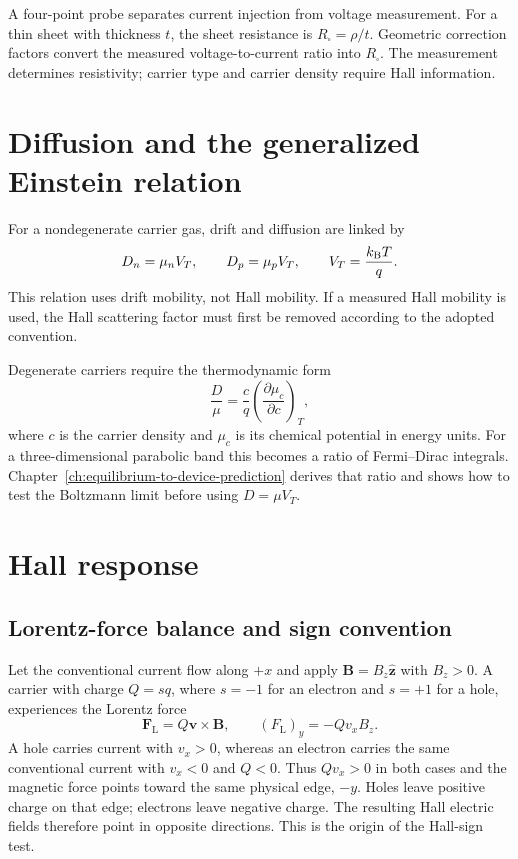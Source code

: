 A four-point probe separates current injection from voltage measurement.  For
a thin sheet with thickness $t$, the sheet resistance is $R_{\square}=\rho/t$.
Geometric correction factors convert the measured voltage-to-current ratio
into $R_{\square}$.  The measurement determines resistivity; carrier type and
carrier density require Hall information.

\section{Diffusion and the generalized Einstein relation}

For a nondegenerate carrier gas, drift and diffusion are linked by
\begin{equation}
 D_n=\mu_nV_T,
 \qquad
 D_p=\mu_pV_T,
 \qquad
 V_T=\frac{k_{\mathrm B} T}{q}.
 \label{eq:transport-classical-einstein}
\end{equation}
This relation uses drift mobility, not Hall mobility.  If a measured Hall
mobility is used, the Hall scattering factor must first be removed according to
the adopted convention.

Degenerate carriers require the thermodynamic form
\begin{equation}
 \frac{D}{\mu}
 =\frac{c}{q}\left(\frac{\partial\mu_c}{\partial c}\right)_T,
 \label{eq:transport-generalized-einstein}
\end{equation}
where $c$ is the carrier density and $\mu_c$ is its chemical potential in
energy units.  For a three-dimensional parabolic band this becomes a ratio of
Fermi--Dirac integrals.  Chapter~\ref{ch:equilibrium-to-device-prediction}
derives that ratio and shows how to test the Boltzmann limit before using
$D=\mu V_T$.

\section{Hall response}

\subsection{Lorentz-force balance and sign convention}

Let the conventional current flow along $+x$ and apply
$\bm B=B_z\hat{\bm z}$ with $B_z>0$.  A carrier with charge $Q=sq$, where
$s=-1$ for an electron and $s=+1$ for a hole, experiences the Lorentz force
\begin{equation}
  \boxed{\bm F_{\mathrm L}=Q\bm v\times\bm B,}
  \qquad
  (F_{\mathrm L})_y=-Qv_xB_z.
  \label{eq:transport-lorentz-force}
\end{equation}
A hole carries current with $v_x>0$, whereas an electron carries the same
conventional current with $v_x<0$ and $Q<0$.  Thus $Qv_x>0$ in both cases and
the magnetic force points toward the same physical edge, $-y$.  Holes leave
positive charge on that edge; electrons leave negative charge.  The resulting
Hall electric fields therefore point in opposite directions.  This is the
origin of the Hall-sign test.

